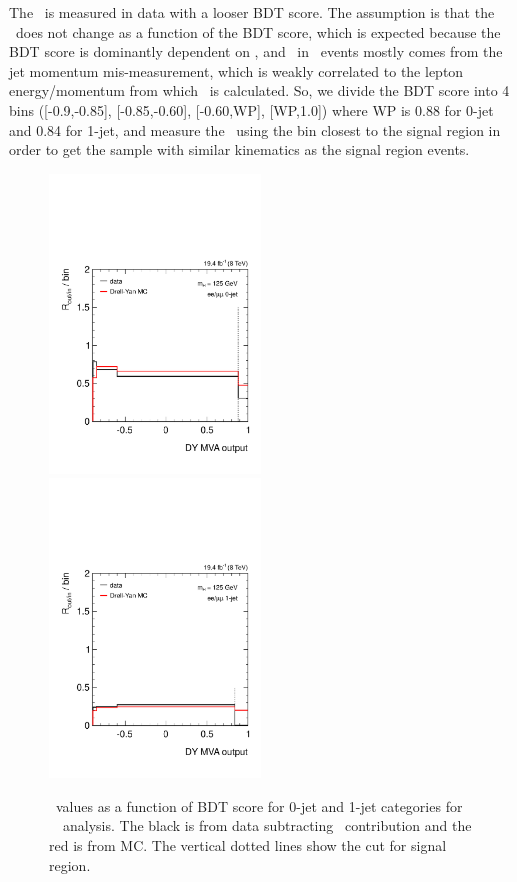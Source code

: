 The \routin\ is measured in data with a looser BDT score. 
The assumption is that the \routin\ does not change as a function of 
the BDT score, which is expected because the BDT score is dominantly dependent on \met,
and \met\ in \dyll\ events mostly comes from the jet momentum mis-measurement, 
which is weakly correlated to the lepton energy/momentum from which 
\mll\ is calculated. So, we divide the BDT score into 4 bins
([-0.9,-0.85], [-0.85,-0.60], [-0.60,WP], [WP,1.0]) where WP 
is 0.88 for 0-jet and 0.84 for 1-jet, and measure the 
\routin\ using the bin closest to the signal region in order to get the 
sample with similar kinematics as the signal region events.  
\begin{figure}[ht!] 
\centering 
\includegraphics[width=0.5\textwidth]{figures/Routin_0Jet_mH125_19467pb_dy.pdf} 
\includegraphics[width=0.5\textwidth]{figures/Routin_1Jet_mH125_19467pb_dy.pdf} 
\caption{\routin\ values as a function of BDT score for 0-jet and 1-jet categories
for ~\GeV\ analysis. 
The black is from data subtracting \vv\ contribution and the red is from MC. 
The vertical dotted lines show the cut for signal region.} 
\label{fig:routin_mh125} 
\end{figure} 
